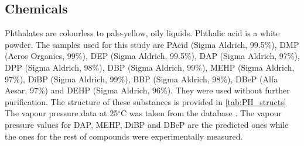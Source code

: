 \subsection{Chemicals}
Phthalates are colourless to pale-yellow, oily liquids. Phthalic acid is a white powder.
The samples used for this study  are
%
%
PAcid (Sigma Aldrich, 99.5\%),                              %
DMP (Acros Organics, 99\%),                     %
DEP (Sigma Aldrich, 99.5\%),                     %
DAP (Sigma Aldrich, 97\%),                       %
DPP (Sigma Aldrich, 98\%),                      %
DBP (Sigma Aldrich, 99\%),                       %
MEHP (Sigma Aldrich, 97\%),               %
DiBP (Sigma Aldrich, 99\%),                   %
BBP (Sigma Aldrich, 98\%),                  %
DBeP (Alfa Aesar, 97\%)                         %
and
DEHP (Sigma Aldrich, 96\%). %
%
%
%
%
%
%
%
%
They were used without further purification.
%
The structure of these substances is provided in \autoref{tab:PH_structs}
%
The vapour pressure data at 25$^\circ$C was taken from the \citeauthor{USAEPA} database \cite{USAEPA}. The vapour pressure values for DAP, MEHP, DiBP and DBeP are the predicted ones while the ones for the rest of compounds were experimentally measured.


